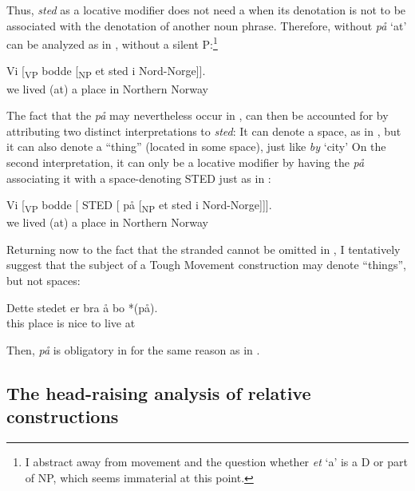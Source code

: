 \documentclass[output=paper]{LSP/langsci}
\begin{document}
Thus, \textit{sted} as a locative modifier does not need a  when its denotation is not to be associated with the denotation of another noun phrase. Therefore,  without \textit{på} `at' can be analyzed as in , without a silent P:\footnote{I abstract away from  movement and the question whether \textit{et} `a' is a D or part of NP, which seems immaterial at this point.}

\ea%
    \label{ex:taraldsen:41}
    \gll Vi [\textsubscript{VP} bodde [\textsubscript{NP} et sted i Nord-Norge]].\\
         we {}                   {lived (at)} {}  a place in {Northern Norway} \\
\z

The fact that the  \textit{på} may nevertheless occur in , can then be accounted for by attributing two distinct interpretations to \textit{sted}: It can denote a space, as in , but it can also denote a ``thing” (located in some space), just like \textit{by} `city' On the second interpretation, it can only be a locative modifier by having the  \textit{på} associating it with a space-denoting STED just as in :

\ea%
    \label{ex:taraldsen:42}
    \gll Vi [\textsubscript{VP} bodde {[ STED [} på {[\textsubscript{NP}} et sted i Nord-Norge]]].\\
         we {}                  lived {}        (at)  {} a place in {Northern Norway}\\
\z

Returning now to the fact that the stranded  cannot be omitted in , I tentatively suggest that the subject of a Tough Movement construction may denote ``things”, but not spaces:

\begin{exe}
\gll   Dette stedet er bra å bo *(på).\\
       this place is nice to live  at\\
\end{exe}
Then, \textit{på} is obligatory in  for the same reason as in .

\subsection{ The head-raising analysis of relative constructions}\label{sec:taraldsen:4.3}
\end{document}
